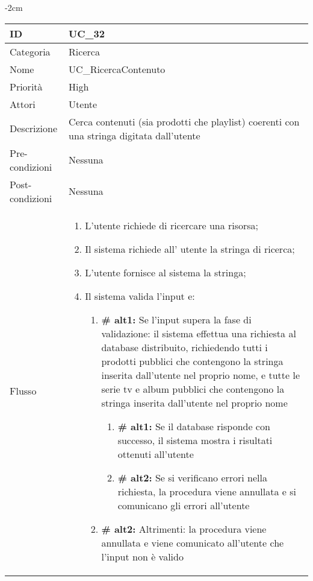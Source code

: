 \begin{center}
\begin{table}[bp]
    \centering
    \addtolength{\leftskip} {-2cm}
\begin{tabular}{ |p{2.6cm}|p{13cm}|  }
\hline
ID & UC\_32 \\\hline
Categoria & Ricerca \\\hline
Nome & UC\_RicercaContenuto\\\hline
Priorità & High \\\hline
Attori &  Utente \\\hline
Descrizione & Cerca contenuti (sia prodotti che playlist) coerenti con una stringa digitata dall'utente\\\hline
Pre-condizioni &  Nessuna\\\hline
Post-condizioni &  Nessuna\\\hline
Flusso &  	\begin{enumerate}
			\item L'utente richiede di ricercare una risorsa;
			\item Il sistema richiede all' utente la stringa di ricerca;
			\item L'utente fornisce al sistema la stringa;
			\item Il sistema valida l'input e:
			\begin{enumerate}[label*=\arabic*.]
			\item \textbf{\# alt1:} Se l'input supera la fase di validazione: il sistema effettua una richiesta al database distribuito, richiedendo tutti i prodotti pubblici che contengono la stringa inserita dall'utente nel proprio nome, e tutte le serie tv e album pubblici che contengono la stringa inserita dall'utente nel proprio nome
				\begin{enumerate}[label*=\arabic*.]
					\item \textbf{\# alt1:} Se il database risponde con successo, il sistema mostra i risultati ottenuti all'utente
					\item \textbf{\# alt2:} Se si verificano errori nella richiesta, la procedura viene annullata e si comunicano gli errori all'utente
				\end{enumerate}
			\item \textbf{\# alt2:} Altrimenti: la procedura viene annullata e viene comunicato all'utente che l'input non è valido
			\end{enumerate}
			
		\end{enumerate}\\\hline
\end{tabular}
\label{table_use_case:32}\newline
\end{table}


\end{center}
